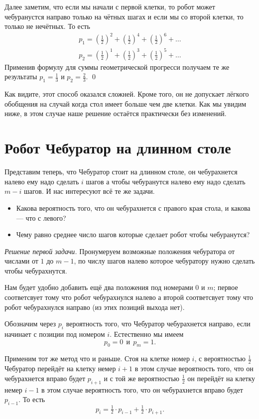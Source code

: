 \documentclass{article}
\begin{document}
Далее заметим, что если мы начали с первой клетки, 
то робот может чебуранустся направо только на чётных шагах 
и если мы со второй клетки, 
то только не нечётных.
То есть
\begin{align*}
p_1=(\tfrac12)^2+(\tfrac12)^4+(\tfrac12)^6+\dots
\\
p_2=(\tfrac12)^1+(\tfrac12)^3+(\tfrac12)^5+\dots
\end{align*}
Применив формулу для суммы геометрической прогресси получаем те же результаты $p_1=\tfrac13$ и $p_2=\tfrac23$.
\qed
\medskip

Как видите, этот способ оказался сложней.
Кроме того, он не допускает лёгкого обобщения на случай когда стол имеет больше чем две клетки.
Как мы увидим ниже, 
в этом случае наше решение остаётся практически без изменений.


\section{Робот Чебуратор на длинном столе} 

Представим теперь, что Чебуратор стоит на длинном столе,
он чебурахнется налево ему надо сделать $i$ шагов
а чтобы чебуранутся налево ему надо сделать $m-i$ шагов.
И нас интересуют всё те же задачи.

\begin{itemize}
\item Какова вероятность того, что он чебурахнется с правого края стола, и какова --- что с левого?
\item Чему равно среднее число шагов которые сделает робот чтобы чебуранутся?
\end{itemize}

\medskip
\noindent\textit{Решение первой задачи.}
Пронумеруем возможные положения чебуратора от числами от $1$ до $m-1$,
по числу шагов налево которое чебуратору нужно сделать чтобы чебурахнутся.

Нам будет удобно добавить ещё два положения под номерами $0$ и $m$;
первое соответсвует тому что робот чебурахнулся налево 
а второй соответсвует тому что робот чебурахнулся направо
(из этих позиций выхода нет).


Обозначим через $p_i$ вероятность того, 
что Чебуратор чебурахнется направо,
если начинает с позиции под номером $i$.
Естественно мы имеем 
\[p_0=0\ \  \text{и}\ \  p_{m}=1.\]

Применим тот же метод что и раньше.
Стоя на клетке номер $i$,
с вероятностью $\tfrac12$ Чебуратор перейдёт на клетку немер $i+1$
в этом случае вероятность того, 
что он чебурахнется вправо будет $p_{i+1}$
и с той же вероятностью $\tfrac12$ он перейдёт на клетку немер $i-1$
в этом случае вероятность того, что он чебурахнется вправо будет $p_{i-1}$.
То есть 
\[p_i=\tfrac12\cdot p_{i-1}+\tfrac12\cdot p_{i+1}.\]
\end{document}
